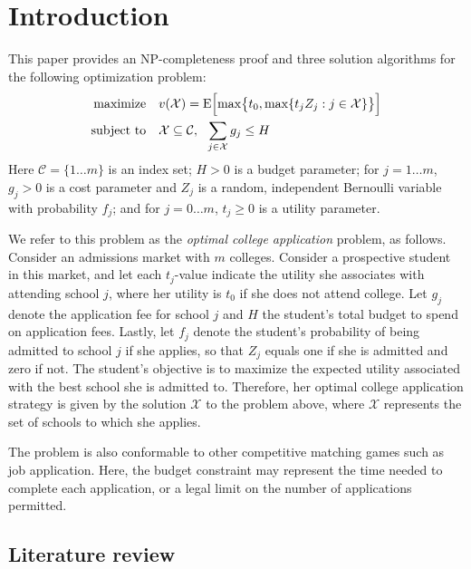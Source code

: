 \section{Introduction}

This paper provides an NP-completeness proof and three solution algorithms for the following optimization problem:
\begin{align} \label{headlineproblem}
\begin{split}
\text{maximize}\quad &  v(\mathcal{X}) =
 \operatorname{E}\Bigl[\max\bigr\{t_0,
\max\{t_j Z_j : j \in \mathcal{X}\}\bigr\}\Bigr] \\
\text{subject to}\quad & \mathcal{X} \subseteq \mathcal{C}, ~~\sum_{j\in \mathcal{X}} g_j \leq H
\end{split}
\end{align}
Here $\mathcal{C} = \{ 1 \dots m\}$ is an index set; $H > 0$ is a budget parameter; for $j = 1 \dots m$, $g_j > 0$ is a cost parameter and $Z_j$ is a random, independent Bernoulli variable with probability $f_j$; and for $j = 0\dots m$, $t_j\geq 0$ is a utility parameter.

We refer to this problem as the \emph{optimal college application} problem, as follows. Consider an admissions market with $m$ colleges. Consider a prospective student in this market, and let each $t_j$-value indicate the utility she associates with attending school $j$, where her utility is $t_0$ if she does not attend college. Let $g_j$ denote the application fee for school $j$ and $H$ the student's total budget to spend on application fees. Lastly, let $f_j$ denote the student's probability of being admitted to school $j$ if she applies, so that $Z_j$ equals one if she is admitted and zero if not. The student's objective is to maximize the expected utility associated with the best school she is admitted to. Therefore, her optimal college application strategy is given by the solution $\mathcal{X}$ to the problem above, where $\mathcal{X}$ represents the set of schools to which she applies. 

The problem is also conformable to other competitive matching games such as job application. Here, the budget constraint may represent the time needed to complete each application, or a legal limit on the number of applications permitted.

\subsection{Literature review}

